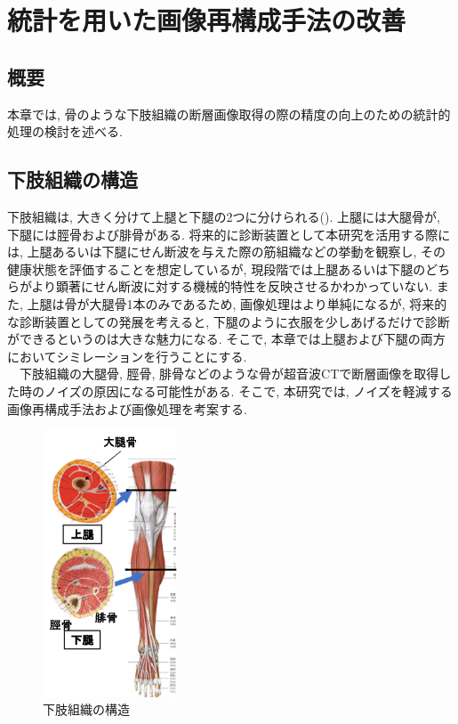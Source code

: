 \chapter{統計を用いた画像再構成手法の改善}
\newpage
\section{概要}
本章では, 骨のような下肢組織の断層画像取得の際の精度の向上のための統計的処理の検討を述べる.
\section{下肢組織の構造}
下肢組織は, 大きく分けて上腿と下腿の2つに分けられる(). 上腿には大腿骨が, 下腿には脛骨および腓骨がある. 将来的に診断装置として本研究を活用する際には, 上腿あるいは下腿にせん断波を与えた際の筋組織などの挙動を観察し, その健康状態を評価することを想定しているが, 現段階では上腿あるいは下腿のどちらがより顕著にせん断波に対する機械的特性を反映させるかわかっていない. また, 上腿は骨が大腿骨1本のみであるため, 画像処理はより単純になるが, 将来的な診断装置としての発展を考えると, 下腿のように衣服を少しあげるだけで診断ができるというのは大きな魅力になる. そこで, 本章では上腿および下腿の両方においてシミレーションを行うことにする. 
\\\ \ 下肢組織の大腿骨, 脛骨, 腓骨などのような骨が超音波CTで断層画像を取得した時のノイズの原因になる可能性がある. そこで, 本研究では, ノイズを軽減する画像再構成手法および画像処理を考案する. 
\begin{figure}[H]
  \begin{center}
    \includegraphics[width=40mm]{fig/kashisohiki.pdf}
  \end{center}
  \caption{下肢組織の構造}
\end{figure}
